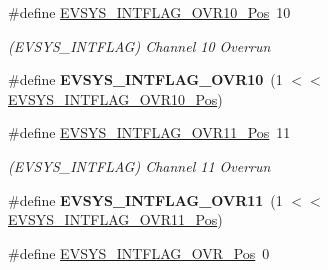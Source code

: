 \begin{DoxyCompactItemize}
\item 
\hypertarget{group___s_a_m_l21___e_v_s_y_s_gaec749dd2bbe62e58456cc9a583aa624b}{}\#define \hyperlink{group___s_a_m_l21___e_v_s_y_s_gaec749dd2bbe62e58456cc9a583aa624b}{E\+V\+S\+Y\+S\+\_\+\+I\+N\+T\+F\+L\+A\+G\+\_\+\+O\+V\+R10\+\_\+\+Pos}~10\label{group___s_a_m_l21___e_v_s_y_s_gaec749dd2bbe62e58456cc9a583aa624b}

\begin{DoxyCompactList}\small\item\em (E\+V\+S\+Y\+S\+\_\+\+I\+N\+T\+F\+L\+A\+G) Channel 10 Overrun \end{DoxyCompactList}\item 
\hypertarget{group___s_a_m_l21___e_v_s_y_s_ga1b8d5f854666b7a85cb6917e333533e9}{}\#define {\bfseries E\+V\+S\+Y\+S\+\_\+\+I\+N\+T\+F\+L\+A\+G\+\_\+\+O\+V\+R10}~(1 $<$$<$ \hyperlink{group___s_a_m_l21___e_v_s_y_s_gaec749dd2bbe62e58456cc9a583aa624b}{E\+V\+S\+Y\+S\+\_\+\+I\+N\+T\+F\+L\+A\+G\+\_\+\+O\+V\+R10\+\_\+\+Pos})\label{group___s_a_m_l21___e_v_s_y_s_ga1b8d5f854666b7a85cb6917e333533e9}

\item 
\hypertarget{group___s_a_m_l21___e_v_s_y_s_ga872f16f082b3c4f57a5edd89fc5e9f65}{}\#define \hyperlink{group___s_a_m_l21___e_v_s_y_s_ga872f16f082b3c4f57a5edd89fc5e9f65}{E\+V\+S\+Y\+S\+\_\+\+I\+N\+T\+F\+L\+A\+G\+\_\+\+O\+V\+R11\+\_\+\+Pos}~11\label{group___s_a_m_l21___e_v_s_y_s_ga872f16f082b3c4f57a5edd89fc5e9f65}

\begin{DoxyCompactList}\small\item\em (E\+V\+S\+Y\+S\+\_\+\+I\+N\+T\+F\+L\+A\+G) Channel 11 Overrun \end{DoxyCompactList}\item 
\hypertarget{group___s_a_m_l21___e_v_s_y_s_ga7e1e779b4ee1a51cf8e45319386086e8}{}\#define {\bfseries E\+V\+S\+Y\+S\+\_\+\+I\+N\+T\+F\+L\+A\+G\+\_\+\+O\+V\+R11}~(1 $<$$<$ \hyperlink{group___s_a_m_l21___e_v_s_y_s_ga872f16f082b3c4f57a5edd89fc5e9f65}{E\+V\+S\+Y\+S\+\_\+\+I\+N\+T\+F\+L\+A\+G\+\_\+\+O\+V\+R11\+\_\+\+Pos})\label{group___s_a_m_l21___e_v_s_y_s_ga7e1e779b4ee1a51cf8e45319386086e8}

\item 
\hypertarget{group___s_a_m_l21___e_v_s_y_s_ga330504a44a29458d9dd09c5ee73ba6d5}{}\#define \hyperlink{group___s_a_m_l21___e_v_s_y_s_ga330504a44a29458d9dd09c5ee73ba6d5}{E\+V\+S\+Y\+S\+\_\+\+I\+N\+T\+F\+L\+A\+G\+\_\+\+O\+V\+R\+\_\+\+Pos}~0\label{group___s_a_m_l21___e_v_s_y_s_ga330504a44a29458d9dd09c5ee73ba6d5}


\end{DoxyCompactItemize}
